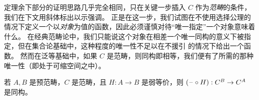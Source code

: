 定理余下部分的证明思路几乎完全相同，只在关键一步插入 $C$ 作为\emph{范畴}的条件，我们在下文用斜体标出以示强调。
正是在这一步，我们试图在不使用选择公理的情况下定义一个以\emph{对象}为值的函数，因此必须谨慎对待``唯一指定''一个对象意味着什么。
在经典范畴论中，我们只能说这个对象在相差一个唯一同构的意义下被指定，但在集合论基础中，这种程度的唯一性不足以在不援引 \choice{} 的情况下给出一个函数。
然而在泛等基础中，如果 $C$ 是范畴，则同构即相等，我们便有了所需的那种唯一性（即处于可缩空间之中）。

%

\begin{thm}\label{ct:cat-weq-eq}
  若 $A,B$ 是预范畴，$C$ 是范畴，且 $H:A\to B$ 是弱等价，则 $(\mathord{\hspace{1pt}\text{--}\hspace{1pt}}\circ H):C^B \to C^A$ 是同构。
\end{thm}

